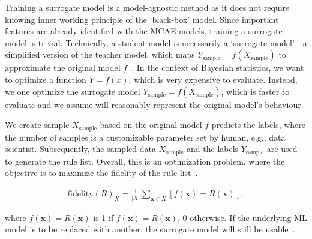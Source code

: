 \hspace*{3.5mm} Training a surrogate model is a model-agnostic method as it does not require knowing inner working principle of the `black-box' model. Since important features are already identified with the MCAE models, training a surrogate model is trivial. Technically, a student model is necessarily a `surrogate model' - a simplified version of the teacher model, which maps $Y_\text{sample}=f(X_\text{sample})$ to approximate the original model $f$~\cite{forrester2008engineering}. In the context of Bayesian statistics, we want to optimize a function $Y=f(x)$, which is very expensive to evaluate. Instead, we one optimize the surrogate model $Y_\text{sample}=f(X_\text{sample})$, which is faster to evaluate and we assume will reasonably represent the original model's behaviour. 

\hspace*{3.5mm} We create sample ${X}_{\text {sample}}$ based on the original model $f$ predicts the labels, where the number of samples is a customizable parameter set by human, e.g., data scientist. Subsequently, the sampled data ${X}_{\text {sample}}$ and the labels ${Y}_{\text {sample}}$ are used to generate the rule list. Overall, this is an optimization problem, where the objective is to maximize the fidelity of the rule list~\cite{ming2018rulematrix}.  

\vspace{-6mm}
\begin{align}
    \text {fidelity}(R)_{{X}}=\frac{1}{|{X}|} \sum_{\boldsymbol{x} \in {X}}[f(\boldsymbol{x})=R(\boldsymbol{x})],
    \label{eq:fidelity}
\end{align}

\hspace*{3.5mm} where $f(\boldsymbol{x})=R(\boldsymbol{x})$ is 1 if $f(\boldsymbol{x})=R(\boldsymbol{x})$, 0 otherwise. If the underlying ML model is to be replaced with another, the surrogate model will still be usable~\cite{molnar2019interpretable}. 


